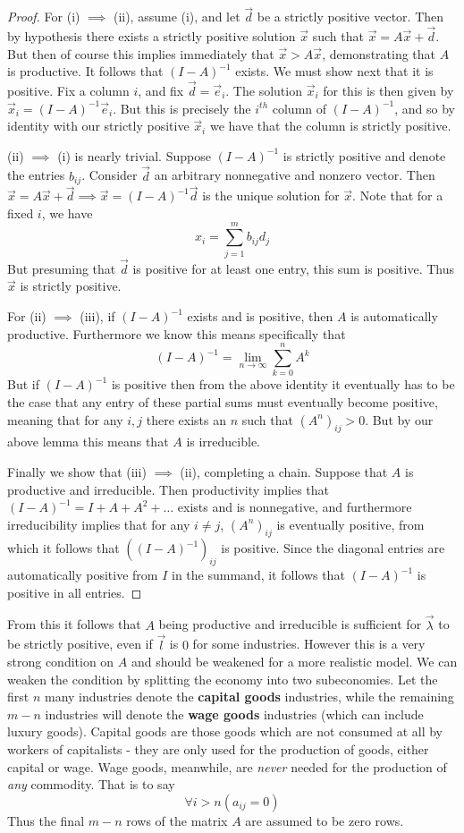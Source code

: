 \begin{proof}
	For (i) $\implies$ (ii), assume (i), and let $\vec{d}$ be a strictly positive vector. Then by hypothesis there exists a strictly positive solution $\vec{x}$ such that $\vec{x} = A\vec{x} + \vec{d}$. But then of course this implies immediately that $\vec{x} > A\vec{x}$, demonstrating that $A$ is productive. It follows that $(I-A)^{-1}$ exists. We must show next that it is positive. Fix a column $i$, and fix $\vec{d} = \vec{e}_i$. The solution $\vec{x}_i$ for this is then given by $\vec{x}_i = (I-A)^{-1}\vec{e}_i$. But this is precisely the $i^{th}$ column of $(I-A)^{-1}$, and so by identity with our strictly positive $\vec{x}_i$ we have that the column is strictly positive. \par 
	(ii) $\implies$ (i) is nearly trivial. Suppose $(I-A)^{-1}$ is strictly positive and denote the entries $b_{ij}$. Consider $\vec{d}$ an arbitrary nonnegative and nonzero vector. Then $\vec{x} = A\vec{x} + \vec{d} \implies \vec{x} = (I-A)^{-1}\vec{d}$ is the unique solution for $\vec{x}$. Note that for a fixed $i$, we have
	\[ x_i = \sum_{j=1}^m b_{ij}d_j \]
But presuming that $\vec{d}$ is positive for at least one entry, this sum is positive. Thus $\vec{x}$ is strictly positive. \par 
For (ii) $\implies$ (iii), if $(I-A)^{-1}$ exists and is positive, then $A$ is automatically productive. Furthermore we know this means specifically that
\[ (I-A)^{-1} = \lim_{n \to \infty} \sum_{k=0}^n A^k \]
But if $(I-A)^{-1}$ is positive then from the above identity it eventually has to be the case that any entry of these partial sums must eventually become positive, meaning that for any $i,j$ there exists an $n$ such that $(A^n)_{ij} > 0$. But by our above lemma this means that $A$ is irreducible. \par 
Finally we show that (iii) $\implies$ (ii), completing a chain. Suppose that $A$ is productive and irreducible. Then productivity implies that $(I-A)^{-1} = I+A+A^2+\ldots$ exists and is nonnegative, and furthermore irreducibility implies that for any $i \neq j$, $(A^n)_{ij}$ is eventually positive, from which it follows that $((I-A)^{-1})_{ij}$ is positive. Since the diagonal entries are automatically positive from $I$ in the summand, it follows that $(I-A)^{-1}$ is positive in all entries. 
\end{proof}
From this it follows that $A$ being productive and irreducible is sufficient for $\vec{\lambda}$ to be strictly positive, even if $\vec{l}$ is $0$ for some industries. However this is a very strong condition on $A$ and should be weakened for a more realistic model. We can weaken the condition by splitting the economy into two subeconomies. Let the first $n$ many industries denote the \textbf{capital goods} industries, while the remaining $m-n$ industries will denote the \textbf{wage goods} industries (which can include luxury goods). Capital goods are those goods which are not consumed at all by workers of capitalists - they are only used for the production of goods, either capital or wage. Wage goods, meanwhile, are \emph{never} needed for the production of \emph{any} commodity. That is to say
\[ \forall i > n (a_{ij} = 0) \]
Thus the final $m-n$ rows of the matrix $A$ are assumed to be zero rows. 


